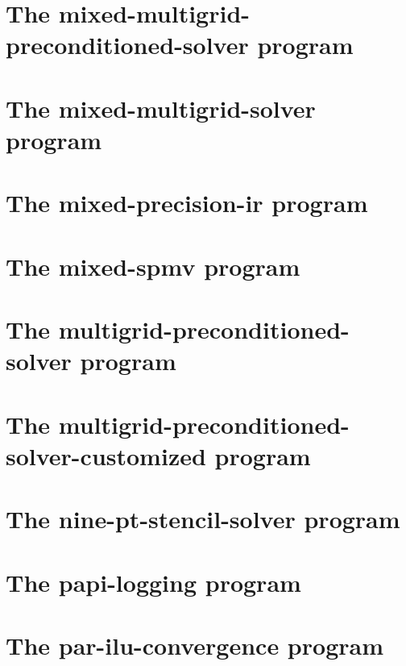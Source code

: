 \let\mypdfximage\pdfximage\def\pdfximage{\immediate\mypdfximage}\documentclass[twoside]{book}
\newcommand{\+}{\discretionary{\mbox{\scriptsize$\hookleftarrow$}}{}{}}
\begin{document}
\chapter{The mixed-\/multigrid-\/preconditioned-\/solver program}
\label{mixed_multigrid_preconditioned_solver}

\chapter{The mixed-\/multigrid-\/solver program}
\label{mixed_multigrid_solver}

\chapter{The mixed-\/precision-\/ir program}
\label{mixed_precision_ir}

\chapter{The mixed-\/spmv program}
\label{mixed_spmv}

\chapter{The multigrid-\/preconditioned-\/solver program}
\label{multigrid_preconditioned_solver}

\chapter{The multigrid-\/preconditioned-\/solver-\/customized program}
\label{multigrid_preconditioned_solver_customized}

\chapter{The nine-\/pt-\/stencil-\/solver program}
\label{nine_pt_stencil_solver}

\chapter{The papi-\/logging program}
\label{papi_logging}

\chapter{The par-\/ilu-\/convergence program}
\label{par_ilu_convergence}

\end{document}
